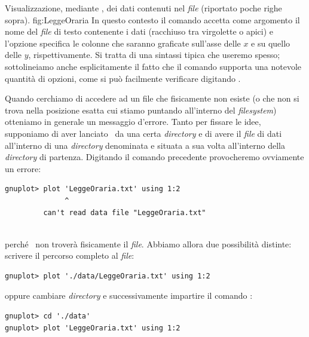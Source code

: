 {Visualizzazione, mediante \gnuplot, dei dati contenuti nel \emph{file}
 (riportato poche righe sopra).}
{fig:LeggeOraria}
In questo contesto il comando  accetta come argomento il
nome del \emph{file} di testo contenente i dati (racchiuso tra virgolette o
apici) e l'opzione  specifica le colonne che saranno
graficate sull'asse delle $x$ e su quello delle $y$, rispettivamente.
Si tratta di una sintassi tipica che useremo spesso; sottolineiamo anche
esplicitamente il fatto che il comando  supporta una notevole
quantit\`a di opzioni, come si pu\`o facilmente verificare digitando
.



Quando cerchiamo di accedere ad un file che fisicamente non esiste
(o che non si trova nella posizione esatta cui stiamo puntando
all'interno del \emph{filesystem}) otteniamo in generale un messaggio d'errore.
Tanto per fissare le idee, supponiamo di aver lanciato \gnuplot\ da una certa
\emph{directory} e di avere il \emph{file} di dati 
all'interno di una \emph{directory} denominata  e situata a sua
volta all'interno della \emph{directory} di partenza.
Digitando il comando precedente provocheremo ovviamente un errore:
\begin{verbatim}
gnuplot> plot 'LeggeOraria.txt' using 1:2
              ^
         can't read data file "LeggeOraria.txt"
           
\end{verbatim}
perch\'e \gnuplot\ non trover\`a fisicamente il \emph{file}. Abbiamo allora
due possibilit\`a distinte: scrivere il percorso completo al \emph{file}:
\begin{verbatim}
gnuplot> plot './data/LeggeOraria.txt' using 1:2
\end{verbatim}
oppure cambiare \emph{directory} e successivamente impartire il comando
:
\begin{verbatim}
gnuplot> cd './data'
gnuplot> plot 'LeggeOraria.txt' using 1:2
\end{verbatim}

